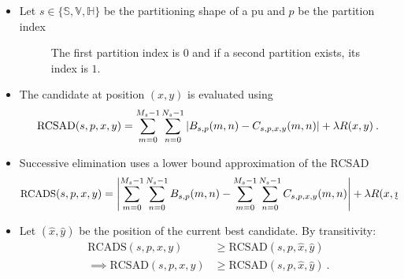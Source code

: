 \documentclass[10pt, sans, mathserif]{beamer}
\DeclarePairedDelimiter\abs{\lvert}{\rvert}%
\newcommand{\sumsum}{
    \sum_{m = 0}^{M_s-1}\sum_{n = 0}^{N_s-1}
}
\newcommand{\sad}{
    \sumsum{\abs*{B_{s,p}(m,n) - C_{s,p,x,y}(m,n)}}
}
\begin{document}
\begin{frame}[t]
\begin{columns}[t, onlytextwidth]
\begin{column}{0.5\textwidth}
\begin{block}{}
        \end{block}

            \begin{block}{}
            \begin{itemize}
            \item Let $s \in \{\mathbb{S}, \mathbb{V}, \mathbb{H}\}$ be the partitioning shape of a \gls{pu} and $p$ be the partition index
            \begin{figure}[htb]
                \centering
                
                \caption{The first partition index is $0$ and if a second partition exists, its index is $1$.}
                \label{fig:CUShapes}
            \end{figure}
            \item The candidate at position $(x,y)$ is evaluated using
            \[
                \text{RCSAD}(s,p,x,y) = \sad + \lambda R(x,y) \:.
            \]

            \item Successive elimination uses a lower bound approximation of the RCSAD
            \[ \small
                \text{RCADS}(s,p,x,y) = \abs*{\sumsum{B}_{s,p}(m,n) - \sumsum{C_{s,p,x,y}(m,n)}} + \lambda R(x,y)\:.
                \label{eq:RCADS}
            \]

            \item Let $(\hat{x},\hat{y})$ be the position of the current best candidate. By transitivity:
            \begin{align*}
                \text{RCADS}(s,p,x,y) &\geqslant \text{RCSAD}(s,p,\hat{x},\hat{y}) \nonumber \\
                \implies \text{RCSAD}(s,p,x,y) &\geqslant \text{RCSAD}(s,p,\hat{x},\hat{y})\:.
                \label{eq:TransitiveElimination}
            \end{align*}
            \end{itemize}
        \end{block}



\end{column}
\end{columns}
\end{frame}
\end{document}

